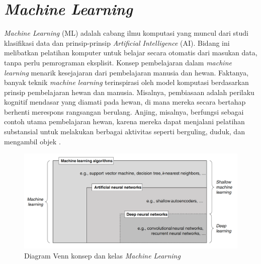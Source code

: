 \section{\emph{Machine Learning}}
\label{sec:machinelearning}

\emph{Machine Learning} (ML) adalah cabang ilmu komputasi yang muncul dari studi klasifikasi data dan prinsip-prinsip \emph{Artificial Intelligence} (AI). Bidang ini melibatkan pelatihan komputer untuk belajar secara otomatis dari masukan data, tanpa perlu pemrograman eksplisit. Konsep pembelajaran dalam \emph{machine learning} menarik kesejajaran dari pembelajaran manusia dan hewan. Faktanya, banyak teknik \emph{machine learning} terinspirasi oleh model komputasi berdasarkan prinsip pembelajaran hewan dan manusia. Misalnya, pembiasaan adalah perilaku kognitif mendasar yang diamati pada hewan, di mana mereka secara bertahap berhenti merespons rangsangan berulang. Anjing, misalnya, berfungsi sebagai contoh utama pembelajaran hewan, karena mereka dapat menjalani pelatihan substansial untuk melakukan berbagai aktivitas seperti berguling, duduk, dan mengambil objek \parencite{Datta}.

\begin{figure}[H]
  \centering
  \includegraphics[scale=0.3]{gambar/machinelearning.png}
  \caption{Diagram Venn konsep dan kelas \emph{Machine Learning} \parencite{Janiesch}}
  \label{fig:machinelearningdiagram}
\end{figure}

